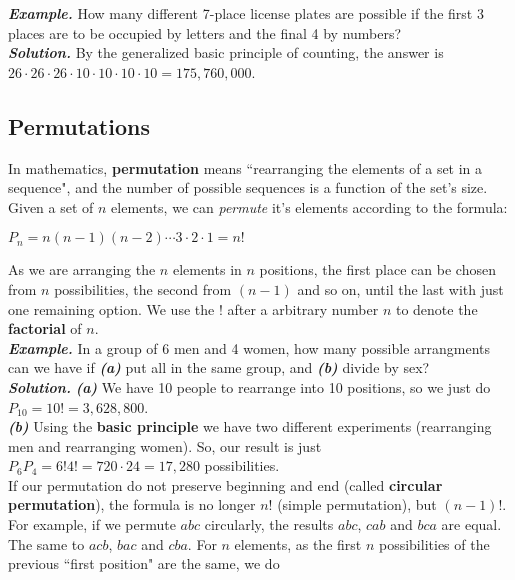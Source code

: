 \documentclass[a4paper,twocolumn]{article}
\begin{document}
\noindent\textbf{\textit{Example.}} How many different 7-place license plates are possible if the first 3 places are to be occupied by letters and the final 4 by numbers?\\
\noindent\textbf{\textit{Solution.}} By the generalized basic principle of counting, the answer is $26 \cdot 26 \cdot 26 \cdot 10 \cdot 10 \cdot 10 \cdot 10 = 175,760,000$.


\subsection{Permutations}

In mathematics, \textbf{permutation} means ``rearranging the elements of a set in a sequence", and the number of possible sequences is a function of the set's size. Given a set of $n$ elements, we can \textit{permute} it's elements according to the formula:

\begin{center}
$P_n = n(n - 1)(n - 2) \dotsm 3 \cdot 2 \cdot 1 = n!$
\end{center}

\noindent As we are arranging the $n$ elements in $n$ positions, the first place can be chosen from $n$ possibilities, the second from $(n - 1)$ and so on, until the last with just one remaining option. We use the $!$ after a arbitrary number $n$ to denote the \textbf{factorial} of $n$.\\

\noindent\textbf{\textit{Example.}} In a group of 6 men and 4 women, how many possible arrangments can we have if \textbf{\textit{(a)}} put all in the same group, and \textbf{\textit{(b)}} divide by sex?\\
\noindent\textbf{\textit{Solution.}} \textbf{\textit{(a)}} We have 10 people to rearrange into 10 positions, so we just do $P_{10} = 10! = 3,628,800$.\\
\textbf{\textit{(b)}} Using the \textbf{basic principle} we have two different experiments (rearranging men and rearranging women). So, our result is just $P_6 P_4 = 6!4! = 720 \cdot 24 = 17,280$ possibilities.\\

If our permutation do not preserve beginning and end (called \textbf{circular permutation}), the formula is no longer $n!$ (simple permutation), but $(n - 1)!$. For example, if we permute $abc$ circularly, the results $abc$, $cab$ and $bca$ are equal. The same to $acb$, $bac$ and $cba$. For $n$ elements, as the first $n$ possibilities of the previous ``first position" are the same, we do
\end{document}
